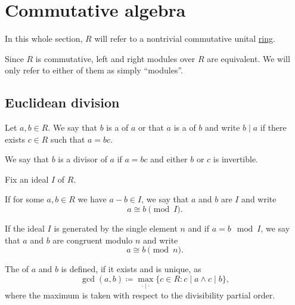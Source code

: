 \section{Commutative algebra}\label{sec:commutative_algebra}

\begin{remark}\label{rem:polynomial_commutative_ring}
  In this whole section, \( R \) will refer to a nontrivial commutative unital \hyperref[def:semiring/commutative_unital_ring]{ring}.

  Since \( R \) is commutative, left and right modules over \( R \) are equivalent. We will only refer to either of them as simply \enquote{modules}.
\end{remark}

\subsection{Euclidean division}\label{subsec:euclidean_division}

\begin{definition}\label{def:commutative_ring_division}
  Let \( a, b \in R \). We say that \( b \) is a  of \( a \) or that \( a \) is a  of \( b \) and write \( b \mid a \) if there exists \( c \in R \) such that \( a = bc \).

  We say that \( b \) is a  divisor of \( a \) if \( a = bc \) and either \( b \) or \( c \) is invertible.
\end{definition}

\begin{definition}\label{def:modulo}
  Fix an ideal \( I \) of \( R \).

  If for some \( a, b \in R \) we have \( a - b \in I \), we say that \( a \) and \( b \) are  \( I \) and write
  \begin{equation*}
    a \cong b \pmod I.
  \end{equation*}

  If the ideal \( I \) is generated by the single element \( n \) and if \( a = b \mod I \), we say that \( a \) and \( b \) are congruent modulo \( n \) and write
  \begin{equation*}
    a \cong b \pmod n.
  \end{equation*}
\end{definition}

\begin{definition}\label{def:greatest_common_denominator}
  The   of \( a \) and \( b \) is defined, if it exists and is unique, as
  \begin{equation*}
    \gcd(a, b) \coloneqq \max_{\cdot \mid \cdot} \{ c \in R : c \mid a \wedge c \mid b \},
  \end{equation*}
  where the maximum is taken with respect to the divisibility partial order.
\end{definition}

